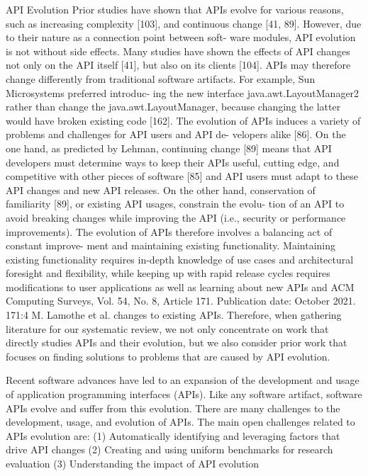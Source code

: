 API Evolution
Prior studies have shown that APIs evolve for various reasons, such as increasing complexity [103],
and continuous change [41, 89]. However, due to their nature as a connection point between soft-
ware modules, API evolution is not without side effects. Many studies have shown the effects of
API changes not only on the API itself [41], but also on its clients [104]. APIs may therefore change
differently from traditional software artifacts. For example, Sun Microsystems preferred introduc-
ing the new interface java.awt.LayoutManager2 rather than change the java.awt.LayoutManager,
because changing the latter would have broken existing code [162].
The evolution of APIs induces a variety of problems and challenges for API users and API de-
velopers alike [86]. On the one hand, as predicted by Lehman, continuing change [89] means that
API developers must determine ways to keep their APIs useful, cutting edge, and competitive with
other pieces of software [85] and API users must adapt to these API changes and new API releases.
On the other hand, conservation of familiarity [89], or existing API usages, constrain the evolu-
tion of an API to avoid breaking changes while improving the API (i.e., security or performance
improvements). The evolution of APIs therefore involves a balancing act of constant improve-
ment and maintaining existing functionality. Maintaining existing functionality requires in-depth
knowledge of use cases and architectural foresight and flexibility, while keeping up with rapid
release cycles requires modifications to user applications as well as learning about new APIs and
ACM Computing Surveys, Vol. 54, No. 8, Article 171. Publication date: October 2021.
171:4
M. Lamothe et al.
changes to existing APIs. Therefore, when gathering literature for our systematic review, we not
only concentrate on work that directly studies APIs and their evolution, but we also consider prior
work that focuses on finding solutions to problems that are caused by API evolution.

Recent software advances have led to an expansion of the development and usage of application programming interfaces (APIs).
Like any software artifact, software APIs evolve and suffer from this evolution. There are many challenges to the development, usage, and evolution of APIs.
The main open challenges related to APIs evolution are:
(1) Automatically identifying and leveraging factors that drive API changes
(2) Creating and using uniform benchmarks for research evaluation
(3) Understanding the impact of API evolution

